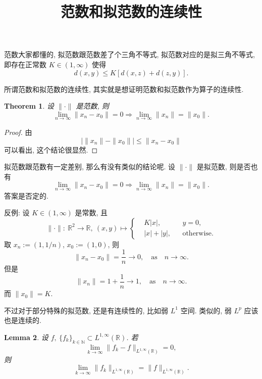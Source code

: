 \documentclass[a4paper,11pt]{article}
\title{范数和拟范数的连续性}
\newtheorem{theorem}{Theorem}[section]
\newtheorem{lemma}[theorem]{Lemma}
\theoremstyle{definition}
\begin{document}
\begin{CJK*}{UTF8}{gbsn}

\maketitle

范数大家都懂的, 拟范数跟范数差了个三角不等式, 拟范数对应的是拟三角不等式, 即存在正常数 $ K \in (1, \infty) $ 使得
$$
    d(x, y) \leq K[d(x, z) + d(z, y)].
$$

所谓范数和拟范数的连续性, 其实就是想证明范数和拟范数作为算子的连续性.

\begin{theorem}
    设 $ \| \cdot \| $ 是范数, 则
    $$
        \lim_{n \to \infty} \| x_n - x_0 \| = 0 
            \Longrightarrow \lim_{n \to \infty} \| x_n \| = \| x_0 \|.
    $$
\end{theorem}

\begin{proof}
    由
    $$ 
        \left| \| x_n \| - \| x_0 \| \right| \leq  \| x_n - x_0 \|
    $$
    可以看出, 这个结论很显然.
\end{proof}

拟范数跟范数有一定差别, 那么有没有类似的结论呢.
设 $ \| \cdot \| $ 是拟范数, 则是否也有
$$
    \lim_{n \to \infty} \| x_n - x_0 \| = 0 
        \Longrightarrow \lim_{n \to \infty} \| x_n \| = \| x_0 \|.
$$
答案是否定的.

反例: 设 $ K \in (1, \infty) $ 是常数, 且
$$ 
    \| \cdot \| :\ \mathbb{R}^2 \to \mathbb{R},\
        (x, y) \mapsto \left\{\begin{aligned}
        & K|x|,       && y = 0, \\
        & |x| + |y|,  && \text{otherwise}.
        \end{aligned}\right.
$$
取 $ x_n := (1, 1/n) $, $ x_0 := (1, 0) $, 则
$$
    \| x_n - x_0 \| = \frac{1}{n} \to 0, \quad \text{as} \quad n \to \infty.
$$
但是
$$
    \| x_n \| = 1 + \frac{1}{n} \to 1, \quad \text{as} \quad n \to \infty.
$$
而 $ \|x_0\| = K $.

不过对于部分特殊的拟范数, 还是有连续性的, 比如弱 $ L^1 $ 空间. 类似的, 弱 $ L^p $ 应该也是连续的.

\begin{lemma} \label{weak}
    设 $ f,\ \{f_k\}_{k \in \mathbb{N}} \subset L^{1, \infty}(\mathbb{R}) $.
    若
    $$
        \lim_{k \to \infty} \| f_k - f \|_{L^{1, \infty}(\mathbb{R})} = 0,
    $$
    则
    $$
        \lim_{k \to \infty} \| f_k \|_{L^{1, \infty}(\mathbb{R})}
            = \| f \|_{L^{1, \infty}(\mathbb{R})}.
    $$
\end{lemma}


\end{CJK*}
\end{document}
